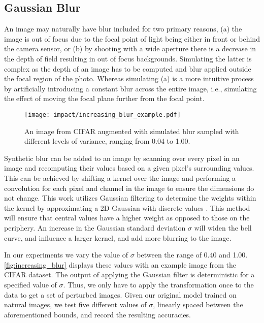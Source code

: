 \documentclass[conference]{IEEEtran}
\begin{document}
\subsection{Gaussian Blur}

An image may naturally have blur included for two primary reasons, (a) the image is out of focus due to the focal point of light being either in front or behind the camera sensor, or (b) by shooting with a wide aperture there is a decrease in the depth of field resulting in out of focus backgrounds. Simulating the latter is complex as the depth of an image has to be computed and blur applied outside the focal region of the photo. Whereas simulating (a) is a more intuitive process by artificially introducing a constant blur across the entire image, i.e., simulating the effect of moving the focal plane further from the focal point.

\begin{figure}[!t]
    \centering
    \texttt{[image: impact/increasing\_blur\_example.pdf]}
    \captionsetup{width=1\columnwidth}
    \caption{An image from CIFAR augmented with simulated blur sampled with different levels of variance, ranging from 0.04 to 1.00.}
    \label{fig:increasing_blur}
\end{figure}

Synthetic blur can be added to an image by scanning over every pixel in an image and recomputing their values based on a given pixel's surrounding values. This can be achieved by shifting a kernel over the image and performing a convolution for each pixel and channel in the image to ensure the dimensions do not change. This work utilizes Gaussian filtering to determine the weights within the kernel by approximating a 2D Gaussian with discrete values \cite{gaussian_filtering}. This method will ensure that central values have a higher weight as opposed to those on the periphery. An increase in the Gaussian standard deviation $\sigma$ will widen the bell curve, and influence a larger kernel, and add more blurring to the image.

In our experiments we vary the value of $\sigma$ between the range of 0.40 and 1.00. \autoref{fig:increasing_blur} displays these values with an example image from the CIFAR dataset. The output of applying the Gaussian filter is deterministic for a specified value of $\sigma$. Thus, we only have to apply the transformation once to the data to get a set of perturbed images. Given our original model trained on natural images, we test five different values of $\sigma$, linearly spaced between the aforementioned bounds, and record the resulting accuracies.
\end{document}
